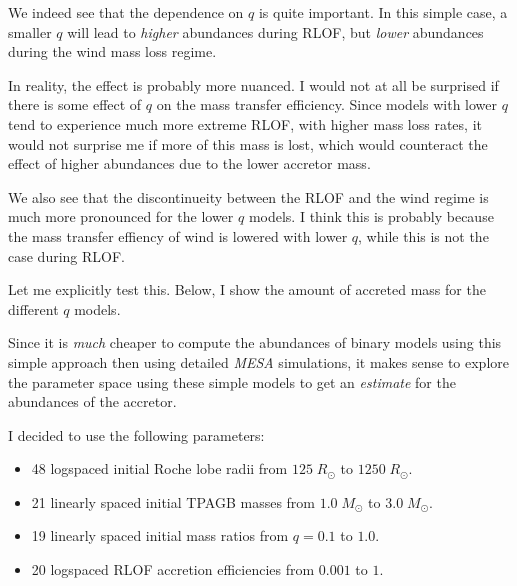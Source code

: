 \documentclass[a4paper,10pt]{article}
\begin{document}
\nextpage

\begin{figure}[ht]
	\centering
\end{figure}

We indeed see that the dependence on \(q\) is quite important.
In this simple case, a smaller
\(q\) will lead to \emph{higher} abundances during RLOF, but \emph{lower} abundances during the
wind mass loss regime.

In reality, the effect is probably more nuanced.
I would not at all be surprised
if there is some effect of \(q\) on the mass transfer efficiency.
Since models with lower
\(q\) tend to experience much more extreme RLOF, with higher mass loss rates, it would not
surprise me if more of this mass is lost, which would counteract the effect of higher abundances
due to the lower accretor mass.

We also see that the discontinueity between the RLOF and the wind regime is much more pronounced
for the lower \(q\) models.
I think this is probably because the mass transfer effiency of
wind is lowered with lower \(q\), while this is not the case during RLOF.

Let me explicitly test this.
Below, I show the amount of accreted mass for the different \(q\) models.
\begin{figure}[ht]
	\centering
\end{figure}

Since it is \emph{much} cheaper to compute the abundances of binary models using this simple approach
then using detailed \emph{MESA} simulations, it makes sense to explore the parameter space using
these simple models to get an \emph{estimate} for the abundances of the accretor.

I decided to use the following parameters:
\begin{itemize}
	\item  48 logspaced initial Roche lobe radii from \(125\; R_\odot \) to \(1250\; R_\odot \).
	\item  21 linearly spaced initial TPAGB masses from \(1.0\; M_\odot \) to \(3.0\; M_\odot \).
	\item 19 linearly spaced initial mass ratios from \(q = 0.1\) to \(1.0\).
	\item 20 logspaced RLOF accretion efficiencies from \(0.001\) to \(1\).
\end{itemize}
\end{document}
